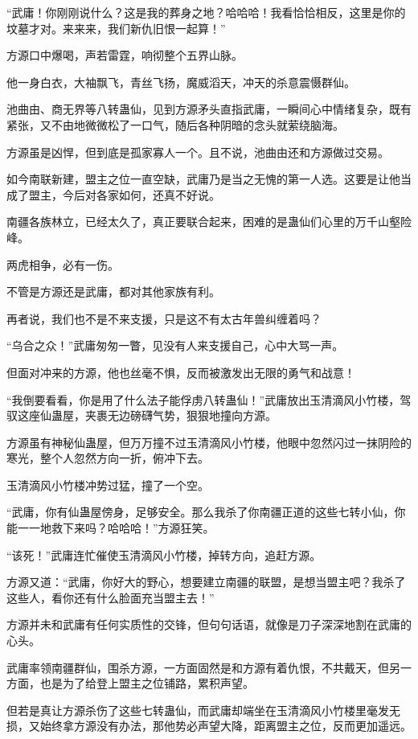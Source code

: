 \begin{this_body}
“武庸！你刚刚说什么？这是我的葬身之地？哈哈哈！我看恰恰相反，这里是你的坟墓才对。来来来，我们新仇旧恨一起算！”

方源口中爆喝，声若雷霆，响彻整个五界山脉。

他一身白衣，大袖飘飞，青丝飞扬，魔威滔天，冲天的杀意震慑群仙。

池曲由、商无界等八转蛊仙，见到方源矛头直指武庸，一瞬间心中情绪复杂，既有紧张，又不由地微微松了一口气，随后各种阴暗的念头就萦绕脑海。

方源虽是凶悍，但到底是孤家寡人一个。且不说，池曲由还和方源做过交易。

如今南联新建，盟主之位一直空缺，武庸乃是当之无愧的第一人选。这要是让他当成了盟主，今后对各家如何，还真不好说。

南疆各族林立，已经太久了，真正要联合起来，困难的是蛊仙们心里的万千山壑险峰。

两虎相争，必有一伤。

不管是方源还是武庸，都对其他家族有利。

再者说，我们也不是不来支援，只是这不有太古年兽纠缠着吗？

“乌合之众！”武庸匆匆一瞥，见没有人来支援自己，心中大骂一声。

但面对冲来的方源，他也丝毫不惧，反而被激发出无限的勇气和战意！

“我倒要看看，你是用了什么法子能俘虏八转蛊仙！”武庸放出玉清滴风小竹楼，驾驭这座仙蛊屋，夹裹无边磅礴气势，狠狠地撞向方源。

方源虽有神秘仙蛊屋，但万万撞不过玉清滴风小竹楼，他眼中忽然闪过一抹阴险的寒光，整个人忽然方向一折，俯冲下去。

玉清滴风小竹楼冲势过猛，撞了一个空。

“武庸，你有仙蛊屋傍身，足够安全。那么我杀了你南疆正道的这些七转小仙，你能一一地救下来吗？哈哈哈！”方源狂笑。

“该死！”武庸连忙催使玉清滴风小竹楼，掉转方向，追赶方源。

方源又道：“武庸，你好大的野心，想要建立南疆的联盟，是想当盟主吧？我杀了这些人，看你还有什么脸面充当盟主去！”

方源并未和武庸有任何实质性的交锋，但句句话语，就像是刀子深深地割在武庸的心头。

武庸率领南疆群仙，围杀方源，一方面固然是和方源有着仇恨，不共戴天，但另一方面，也是为了给登上盟主之位铺路，累积声望。

但若是真让方源杀伤了这些七转蛊仙，而武庸却端坐在玉清滴风小竹楼里毫发无损，又始终拿方源没有办法，那他势必声望大降，距离盟主之位，反而更加遥远。


\end{this_body}
